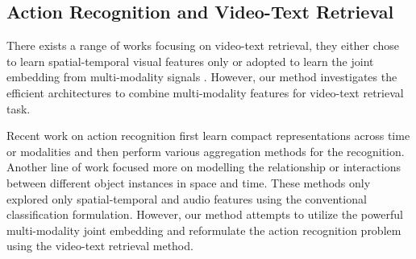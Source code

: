 
\subsection{Action Recognition and Video-Text Retrieval}
There exists a range of works focusing on video-text retrieval, they either chose to learn spatial-temporal visual features only \cite{otani2016learning,dong2016word2visualvec} or adopted to learn the joint embedding from multi-modality signals \cite{miech2018learning,liu2019use,mithun2018learning}. However, our method investigates the efficient architectures to combine multi-modality features for video-text retrieval task. 

Recent work on action recognition first learn compact representations across time or modalities and then perform various aggregation methods for the recognition. Another line of work \cite{wang2018videos,ma2018attend} focused more on modelling the relationship or interactions between different object instances in space and time. These methods only explored only spatial-temporal and audio features using the conventional classification formulation. However, our method attempts to utilize the powerful multi-modality joint embedding and reformulate the action recognition problem using the video-text retrieval method.
 




